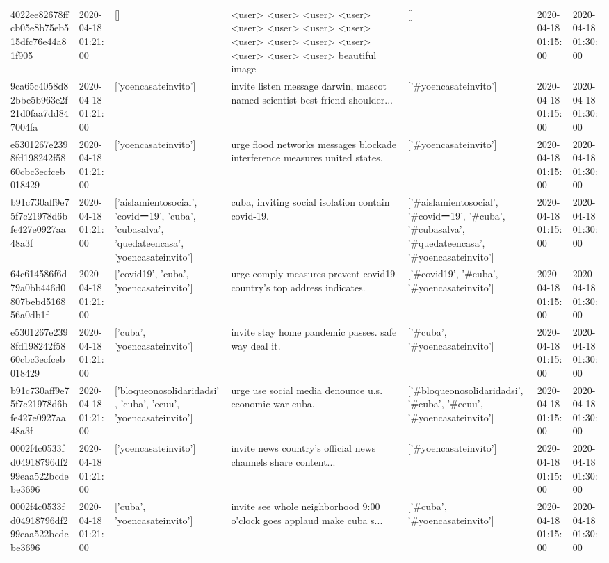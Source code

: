 \begin{tabular}{lllllll}
4022ee82678ffcb05e8b75eb515dfc76e44a81f905 & 2020-04-18 01:21:00 & [] & <user> <user> <user> <user> <user> <user> <user> <user> <user> <user> <user> <user> <user> <user> <user> beautiful image & [] & 2020-04-18 01:15:00 & 2020-04-18 01:30:00 \\
9ca65c4058d82bbc5b963e2f21d0faa7dd847004fa & 2020-04-18 01:21:00 & ['yoencasateinvito'] & invite listen message darwin, mascot named scientist best friend shoulder... & ['#yoencasateinvito'] & 2020-04-18 01:15:00 & 2020-04-18 01:30:00 \\
e5301267e2398fd198242f5860cbc3ecfceb018429 & 2020-04-18 01:21:00 & ['yoencasateinvito'] & urge flood networks messages blockade interference measures united states. & ['#yoencasateinvito'] & 2020-04-18 01:15:00 & 2020-04-18 01:30:00 \\
b91c730aff9e75f7c21978d6bfe427e0927aa48a3f & 2020-04-18 01:21:00 & ['aislamientosocial', 'covidー19', 'cuba', 'cubasalva', 'quedateencasa', 'yoencasateinvito'] & cuba, inviting social isolation contain covid-19. & ['#aislamientosocial', '#covidー19', '#cuba', '#cubasalva', '#quedateencasa', '#yoencasateinvito'] & 2020-04-18 01:15:00 & 2020-04-18 01:30:00 \\
64c614586f6d79a0bb446d0807bebd516856a0db1f & 2020-04-18 01:21:00 & ['covid19', 'cuba', 'yoencasateinvito'] & urge comply measures prevent covid19 country's top address indicates. & ['#covid19', '#cuba', '#yoencasateinvito'] & 2020-04-18 01:15:00 & 2020-04-18 01:30:00 \\
e5301267e2398fd198242f5860cbc3ecfceb018429 & 2020-04-18 01:21:00 & ['cuba', 'yoencasateinvito'] & invite stay home pandemic passes. safe way deal it. & ['#cuba', '#yoencasateinvito'] & 2020-04-18 01:15:00 & 2020-04-18 01:30:00 \\
b91c730aff9e75f7c21978d6bfe427e0927aa48a3f & 2020-04-18 01:21:00 & ['bloqueonosolidaridadsi', 'cuba', 'eeuu', 'yoencasateinvito'] & urge use social media denounce u.s. economic war cuba. & ['#bloqueonosolidaridadsi', '#cuba', '#eeuu', '#yoencasateinvito'] & 2020-04-18 01:15:00 & 2020-04-18 01:30:00 \\
0002f4c0533fd04918796df299eaa522bcdebe3696 & 2020-04-18 01:21:00 & ['yoencasateinvito'] & invite news country's official news channels share content... & ['#yoencasateinvito'] & 2020-04-18 01:15:00 & 2020-04-18 01:30:00 \\
0002f4c0533fd04918796df299eaa522bcdebe3696 & 2020-04-18 01:21:00 & ['cuba', 'yoencasateinvito'] & invite see whole neighborhood 9:00 o'clock goes applaud make cuba s... & ['#cuba', '#yoencasateinvito'] & 2020-04-18 01:15:00 & 2020-04-18 01:30:00 \\

\end{tabular}

